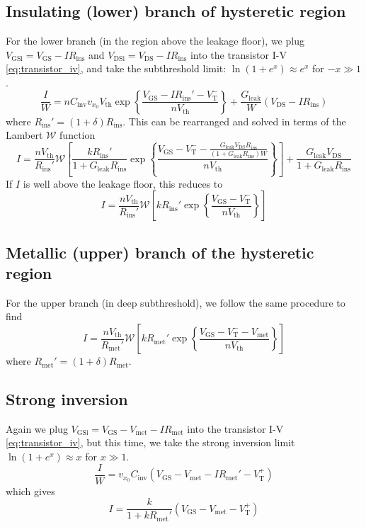 \documentclass[letterpaper]{article}
\newcommand{\VT}{\ensuremath{V_\mathrm{T}}}
\newcommand{\VTm}{\ensuremath{V_\mathrm{T}^-}}
\newcommand{\VTp}{\ensuremath{V_\mathrm{T}^+}}
\newcommand{\Vth}{\ensuremath{V_\mathrm{th}}}
\newcommand{\VGSi}{\ensuremath{V_\mathrm{GSi}}}
\newcommand{\Vmet}{\ensuremath{V_\mathrm{met}}}
\newcommand{\Rins}{\ensuremath{R_\mathrm{ins}}}
\newcommand{\Rmet}{\ensuremath{R_\mathrm{met}}}
\newcommand{\Rinsp}{\ensuremath{R_\mathrm{ins}'}}
\newcommand{\Rmetp}{\ensuremath{R_\mathrm{met}'}}
\begin{document}
\subsection{Insulating (lower) branch of hysteretic region}
For the lower branch (in the region above the leakage floor), we plug $\VGSi=V_\mathrm{GS}-I\Rins $ and $V_\mathrm{DSi}=V_\mathrm{DS}-I\Rins $ into the transistor I-V \eqref{eq:transistor_iv}, and take the subthreshold limit: $\ln(1+e^x)\approx e^x$ for $-x \gg 1$.
\begin{equation}
  \frac{I}{W}=nC_\mathrm{inv}v_{x_0}\Vth\exp\left\{\frac{V_\mathrm{GS}-I\Rinsp -\VTm}{n\Vth }\right\} + \frac{G_\mathrm{leak}}{W}(V_\mathrm{DS}-I\Rins )
\label{eq:insbranch_preW}
\end{equation}
where $\Rinsp=(1+\delta)\Rins$.
This can be rearranged and solved in terms of the Lambert $\mathcal{W}$ function
\begin{equation}
  I=\frac{n\Vth }{\Rinsp }\mathcal{W}\left[\frac{k\Rins' }{1+G_\mathrm{leak}\Rins }\exp\left\{\frac{V_\mathrm{GS}-\VTm-\frac{G_\mathrm{leak} V_\mathrm{DS}\Rins }{(1+G_\mathrm{leak}\Rins )W}}{n\Vth}\right\}\right]+\frac{G_\mathrm{leak}V_\mathrm{DS}}{1+G_\mathrm{leak}\Rins }
\label{eq:insbranch_wleak}
\end{equation}
If $I$ is well above the leakage floor, this reduces to
\begin{equation}
I=\frac{n\Vth }{\Rins'}\mathcal{W}\left[k\Rins'\exp\left\{\frac{V_\mathrm{GS}-\VTm}{n\Vth}\right\}\right]
\label{eq:insbranch}
\end{equation}
\subsection{Metallic (upper) branch of the hysteretic region}
For the upper branch (in deep subthreshold), we follow the same procedure to find
\begin{equation}
  I=\frac{n\Vth }{\Rmetp}\mathcal{W}\left[k\Rmetp \exp\left\{\frac{V_\mathrm{GS}-\VTm-\Vmet}{n\Vth }\right\}\right]
\label{eq:metbranch}
\end{equation}
where $\Rmetp=(1+\delta)\Rmet$.
\subsection{Strong inversion}
Again we plug $\VGSi=V_\mathrm{GS}-V_\mathrm{met}-I\Rmet $ into the transistor I-V \eqref{eq:transistor_iv}, but this time, we take the strong inversion limit $\ln(1+e^x)\approx x$ for $x\gg 1$.
\begin{equation}
  \frac{I}{W}=v_{x_0}C_\mathrm{inv}(V_\mathrm{GS}-V_\mathrm{met}-I\Rmetp -\VTp)
  \label{eq:Isat_pre}
\end{equation}
which gives
\begin{equation}
  I=\frac{k}{1+k\Rmetp}(V_\mathrm{GS}-V_\mathrm{met}-\VTp)
  \label{eq:Isat}
\end{equation}
\end{document}

